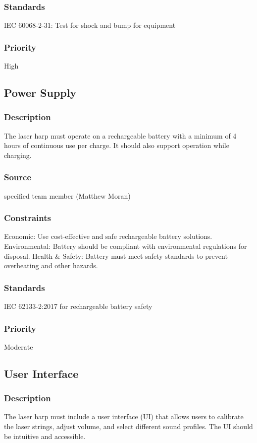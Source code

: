 \subsubsection{Standards}
IEC 60068-2-31: Test for shock and bump for equipment
\subsubsection{Priority}
High


\subsection{Power Supply}
\subsubsection{Description}
The laser harp must operate on a rechargeable battery with a minimum of 4 hours of continuous use per charge. It should also support operation while charging.
\subsubsection{Source}
specified team member (Matthew Moran)
\subsubsection{Constraints}
Economic: Use cost-effective and safe rechargeable battery solutions.
Environmental: Battery should be compliant with environmental regulations for disposal.
Health & Safety: Battery must meet safety standards to prevent overheating and other hazards.
\subsubsection{Standards}
IEC 62133-2:2017 for rechargeable battery safety
\subsubsection{Priority}
Moderate


\subsection{User Interface}
\subsubsection{Description}
The laser harp must include a user interface (UI) that allows users to calibrate the laser strings, adjust volume, and select different sound profiles. The UI should be intuitive and accessible.
